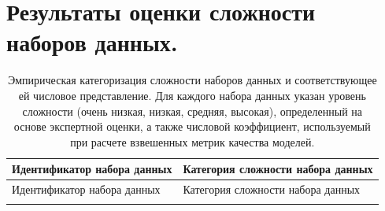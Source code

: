 \documentclass[specification,annotation,times]{itmo-student-thesis}
\begin{document}
\chapter{Результаты оценки сложности наборов данных.}\label{sec:app:2:tab-data}

\small
\begin{longtable}{
| >{\centering\arraybackslash}p{7cm}
| >{\centering\arraybackslash}p{7cm}|
}

\caption{Эмпирическая категоризация сложности наборов данных и соответствующее ей числовое представление. Для каждого набора данных указан уровень сложности (очень низкая, низкая, средняя, высокая), определенный на основе экспертной оценки, а также числовой коэффициент, используемый при расчете взвешенных метрик качества моделей.}
\label{tab:dataset_difficulty} \\

\hline
Идентификатор набора данных & Категория сложности набора данных \\
\hline
\endfirsthead

\hline
Идентификатор набора данных & Категория сложности набора данных \\
\hline
\endhead

\hline
\endfoot

\hline
\endlastfoot


\end{longtable}
\end{document}
